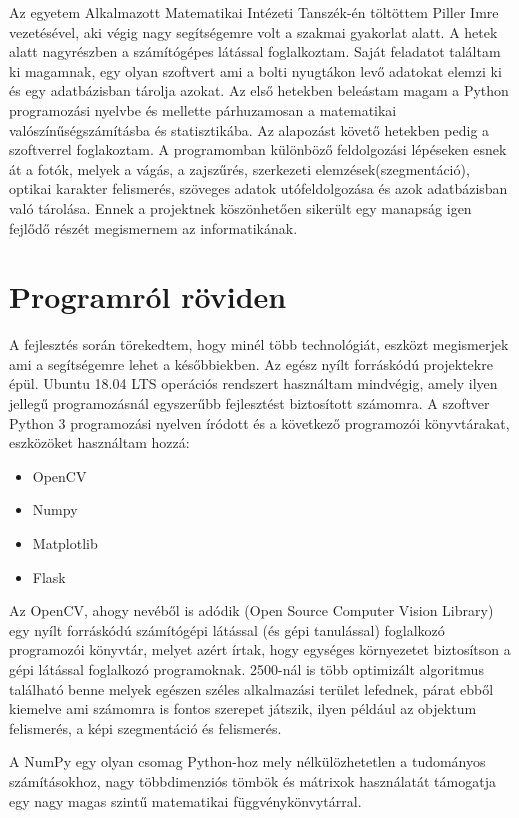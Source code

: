 \documentclass[a4paper,12pt]{article}
\begin{document}
Az egyetem Alkalmazott Matematikai Intézeti Tanszék-én töltöttem Piller Imre vezetésével, aki végig nagy segítségemre volt a szakmai gyakorlat alatt. A hetek alatt nagyrészben a számítógépes látással foglalkoztam. Saját feladatot találtam ki magamnak, egy olyan szoftvert ami a bolti nyugtákon levő adatokat elemzi ki és egy adatbázisban tárolja azokat. Az első hetekben beleástam magam a Python programozási nyelvbe és mellette párhuzamosan a matematikai valószínűségszámításba és statisztikába. Az alapozást követő hetekben pedig a szoftverrel foglakoztam. A programomban különböző feldolgozási lépéseken esnek át a fotók, melyek a vágás, a zajszűrés, szerkezeti elemzések(szegmentáció), optikai karakter felismerés, szöveges adatok utófeldolgozása és azok adatbázisban való tárolása. Ennek a projektnek köszönhetően sikerült egy manapság igen fejlődő részét megismernem az informatikának. 

\newpage
\section{Programról röviden}

A fejlesztés során törekedtem, hogy minél több technológiát, eszközt megismerjek ami a segítségemre lehet a későbbiekben. Az egész nyílt forráskódú projektekre épül. Ubuntu 18.04 LTS operációs rendszert használtam mindvégig, amely ilyen jellegű programozásnál egyszerűbb fejlesztést biztosított számomra. A szoftver Python 3 programozási nyelven íródott és a következő programozói könyvtárakat, eszközöket használtam hozzá: 

\begin{itemize}
	\item OpenCV
	\item Numpy
	\item Matplotlib	
	\item Flask	
\end{itemize}

Az OpenCV, ahogy nevéből is adódik (Open Source Computer Vision Library) egy nyílt forráskódú számítógépi látással (és gépi tanulással) foglalkozó programozói könyvtár, melyet azért írtak, hogy egységes környezetet biztosítson a gépi látással foglalkozó programoknak. 2500-nál is több optimizált algoritmus található benne melyek egészen széles alkalmazási terület lefednek, párat ebből kiemelve ami számomra is fontos szerepet játszik, ilyen például az objektum felismerés, a  képi szegmentáció és felismerés.

A NumPy egy olyan csomag Python-hoz mely nélkülözhetetlen a tudományos számításokhoz, nagy többdimenziós tömbök és mátrixok használatát támogatja egy nagy magas szintű matematikai függvénykönvytárral.
\end{document}
